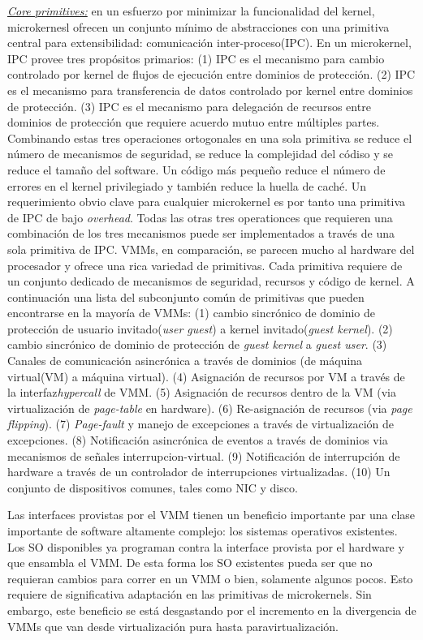 \underline{\emph{Core primitives:}} en un esfuerzo por minimizar la funcionalidad del kernel, microkernesl ofrecen un conjunto mínimo de abstracciones con una primitiva central para extensibilidad: comunicación inter-proceso(IPC). En un microkernel, IPC provee tres propósitos primarios: (1) IPC es el mecanismo para cambio controlado por kernel de flujos de ejecución entre dominios de protección. (2) IPC es el mecanismo para transferencia de datos controlado por kernel entre dominios de protección. (3) IPC es el mecanismo para delegación de recursos entre dominios de protección que requiere acuerdo mutuo entre múltiples partes. Combinando estas tres operaciones ortogonales en una sola primitiva se reduce el número de mecanismos de seguridad, se reduce la complejidad del códiso y se reduce el tamaño del software. Un código más pequeño reduce el número de errores en el kernel privilegiado y también reduce la huella de caché. Un requerimiento obvio clave para cualquier microkernel es por tanto una primitiva de IPC de bajo \emph{overhead}. Todas las otras tres operationces que requieren una combinación de los tres mecanismos puede ser implementados a través de una sola primitiva de IPC. VMMs, en comparación, se parecen mucho al hardware del procesador y ofrece una rica variedad de primitivas. Cada primitiva requiere de un conjunto dedicado de mecanismos de seguridad, recursos y código de kernel. A continuación una lista del subconjunto común de primitivas que pueden encontrarse en la mayoría de VMMs: (1) cambio sincrónico de dominio de protección de usuario invitado(\emph{user guest}) a kernel invitado(\emph{guest kernel}). (2) cambio sincrónico de dominio de protección de \emph{guest kernel} a \emph{guest user}. (3) Canales de comunicación asincrónica a través de dominios (de máquina virtual(VM) a máquina virtual). (4) Asignación de recursos por VM a través de la interfaz\emph{hypercall} de VMM. (5) Asignación de recursos dentro de la VM (via virtualización de \emph{page-table} en hardware). (6) Re-asignación de recursos (via \emph{page flipping}). (7) \emph{Page-fault} y manejo de excepciones a través de virtualización de excepciones. (8) Notificación asincrónica de eventos a través de dominios via mecanismos de señales interrupcion-virtual. (9) Notificación de interrupción de hardware a través de un controlador de interrupciones virtualizadas. (10) Un conjunto de dispositivos comunes, tales como NIC y disco.

Las interfaces provistas por el VMM tienen un beneficio importante par una clase importante de software altamente complejo: los sistemas operativos existentes. Los SO disponibles ya programan contra la interface provista por el hardware y que ensambla el VMM. De esta forma los SO existentes pueda ser que no requieran cambios para correr en un VMM o bien, solamente algunos pocos. Esto requiere de significativa adaptación en las primitivas de microkernels. Sin embargo, este beneficio se está desgastando por el incremento en la divergencia de VMMs que van desde virtualización pura hasta paravirtualización.

